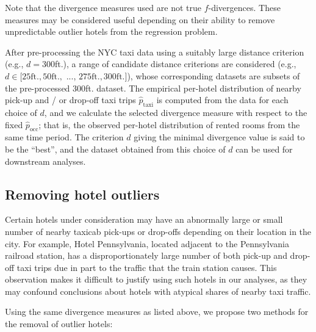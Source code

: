 \documentclass[useAMS, referee, usenatbib]{biom}
\begin{document}
Note that the divergence measures used are not true $f$-divergences. These measures may be considered useful depending on their ability to remove unpredictable outlier hotels from the regression problem.

After pre-processing the NYC taxi data using a suitably large distance criterion (e.g., $d = 300$ft.), a range of candidate distance criterions are considered (e.g., $d \in [25 \mathrm{ft.}, 50 \mathrm{ft.},$ ..., $275 \mathrm{ft.}, 300 \mathrm{ft.}]$), whose corresponding datasets are subsets of the pre-processed 300ft. dataset. The empirical per-hotel distribution of nearby pick-up and / or drop-off taxi trips $\hat{p}_{\mathrm{taxi}}$ is computed from the data for each choice of $d$, and we calculate the selected divergence measure with respect to the fixed $\hat{p}_{\mathrm{occ}}$; that is, the observed per-hotel distribution of rented rooms from the same time period. The criterion $d$ giving the minimal divergence value is said to be the ``best'', and the dataset obtained from this choice of $d$ can be used for downstream analyses.

\subsection{Removing hotel outliers}
\label{ss:hotel_outliers}

Certain hotels under consideration may have an abnormally large or small number of nearby taxicab pick-ups or drop-offs depending on their location in the city. For example, Hotel Pennsylvania, located adjacent to the Pennsylvania railroad station, has a disproportionately large number of both pick-up and drop-off taxi trips due in part to the traffic that the train station causes. This observation makes it difficult to justify using such hotels in our analyses, as they may confound conclusions about hotels with atypical shares of nearby taxi traffic.

Using the same divergence measures as listed above, we propose two methods for the removal of outlier hotels:
\end{document}
